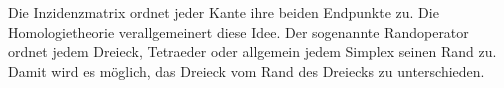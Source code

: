 Die Inzidenzmatrix ordnet jeder Kante ihre beiden Endpunkte zu.
Die Homologietheorie verallgemeinert diese Idee.
Der sogenannte Randoperator ordnet jedem Dreieck, Tetraeder oder allgemein
jedem Simplex seinen Rand zu.
Damit wird es möglich, das Dreieck vom Rand des Dreiecks zu unterschieden.













